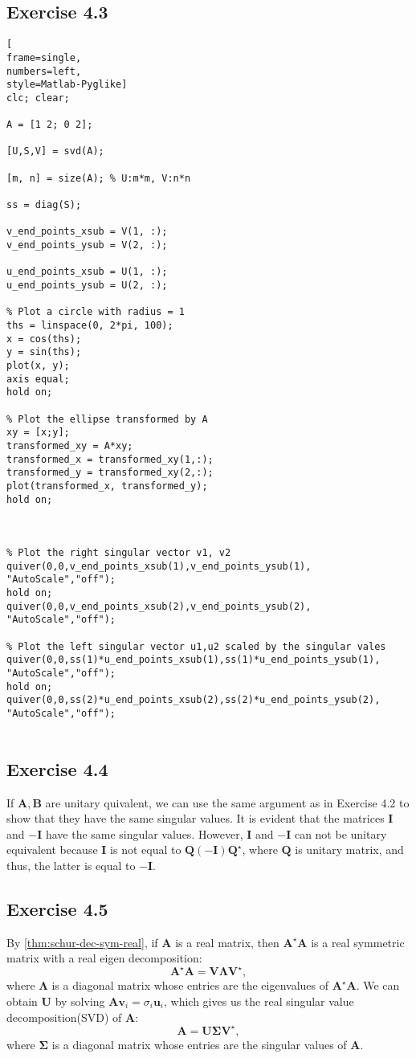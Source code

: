 \documentclass{article}
\begin{document}
\subsection{Exercise 4.3}
\begin{lstlisting}[
frame=single,
numbers=left,
style=Matlab-Pyglike]
clc; clear;

A = [1 2; 0 2];

[U,S,V] = svd(A);

[m, n] = size(A); % U:m*m, V:n*n

ss = diag(S);

v_end_points_xsub = V(1, :);
v_end_points_ysub = V(2, :);

u_end_points_xsub = U(1, :);
u_end_points_ysub = U(2, :);

% Plot a circle with radius = 1
ths = linspace(0, 2*pi, 100);
x = cos(ths);
y = sin(ths);
plot(x, y);
axis equal;
hold on;

% Plot the ellipse transformed by A
xy = [x;y];
transformed_xy = A*xy;
transformed_x = transformed_xy(1,:);
transformed_y = transformed_xy(2,:);
plot(transformed_x, transformed_y);
hold on;



% Plot the right singular vector v1, v2
quiver(0,0,v_end_points_xsub(1),v_end_points_ysub(1), "AutoScale","off");
hold on;
quiver(0,0,v_end_points_xsub(2),v_end_points_ysub(2), "AutoScale","off");

% Plot the left singular vector u1,u2 scaled by the singular vales
quiver(0,0,ss(1)*u_end_points_xsub(1),ss(1)*u_end_points_ysub(1), "AutoScale","off");
hold on;
quiver(0,0,ss(2)*u_end_points_xsub(2),ss(2)*u_end_points_ysub(2), "AutoScale","off");


\end{lstlisting}

\subsection{Exercise 4.4}
If $\bm{A}, \bm{B}$ are unitary quivalent, we can use the same argument as in Exercise 4.2 to show that they have the same singular values. It is evident that the matrices $\bm{I}$ and $-\bm{I}$ have the same singular values. However, $\bm{I}$ and $-\bm{I}$ can not be unitary equivalent because $\bm{I}$ is not equal to $\bm{Q} \left( - \bm
I\right) \bm{Q}^\star$, where $\bm{Q}$ is unitary matrix, and thus, the latter is equal to $-\bm{I}$.

\subsection{Exercise 4.5}
By \autoref{thm:schur-dec-sym-real}, if $\bm{A}$ is a real matrix, then $\bm{A^\star A}$ is a real symmetric matrix with a real eigen decomposition:
$$
\bm{A}^\star \bm{A} = \bm{V} \bm{\Lambda} \bm{V}^{\star},
$$
where $\bm{\Lambda}$ is a diagonal matrix whose entries are the eigenvalues of $\bm{A^\star A}$. We can obtain $\bm{U}$ by solving $\bm{A} \bm{v}_i = \sigma_i \bm{u}_i$, which gives us the real singular value decomposition(SVD) of $\bm{A}$:
$$
\bm{A} = \bm{U} \bm{\Sigma} \bm{V}^\star,
$$
where $\bm{\Sigma}$ is a diagonal matrix whose entries are the singular values of $\bm{A}$. 
\end{document}
